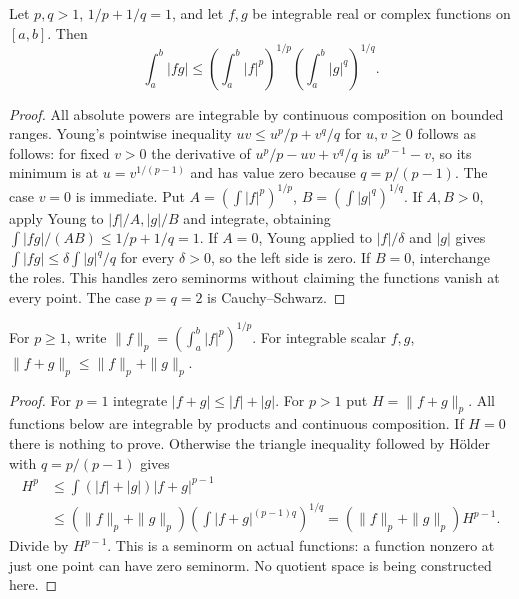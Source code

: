 \begin{theorem}
Let $p,q>1$, $1/p+1/q=1$, and let $f,g$ be integrable real or complex
functions on $[a,b]$. Then
\[\int_a^b|fg|\le
\left(\int_a^b|f|^p\right)^{1/p}
\left(\int_a^b|g|^q\right)^{1/q}.
\]
\end{theorem}
\begin{proof}
All absolute powers are integrable by continuous composition on bounded
ranges. Young's pointwise inequality $uv\le u^p/p+v^q/q$ for $u,v\ge0$
follows as follows: for fixed $v>0$ the derivative of
$u^p/p-uv+v^q/q$ is $u^{p-1}-v$, so its minimum is at
$u=v^{1/(p-1)}$ and has value zero because $q=p/(p-1)$.
The case $v=0$ is immediate.
Put $A=(\int|f|^p)^{1/p}$, $B=(\int|g|^q)^{1/q}$.
If $A,B>0$, apply Young to $|f|/A,|g|/B$ and integrate, obtaining
$\int|fg|/(AB)\le1/p+1/q=1$.
If $A=0$, Young applied to $|f|/\delta$ and $|g|$ gives
$\int|fg|\le\delta\int|g|^q/q$ for every $\delta>0$, so the left
side is zero. If $B=0$, interchange the roles. This handles zero
seminorms without claiming the functions vanish at every point.
The case $p=q=2$ is Cauchy--Schwarz.
\end{proof}

\begin{theorem}
For $p\ge1$, write $\|f\|_p=(\int_a^b|f|^p)^{1/p}$.
For integrable scalar $f,g$, $\|f+g\|_p\le\|f\|_p+\|g\|_p$.
\end{theorem}
\begin{proof}
For $p=1$ integrate $|f+g|\le|f|+|g|$.
For $p>1$ put $H=\|f+g\|_p$. All functions below are integrable
by products and continuous composition. If $H=0$ there is nothing to
prove. Otherwise the triangle inequality followed by H\"older with
$q=p/(p-1)$ gives
\begin{align*}
H^p&\le\int(|f|+|g|)|f+g|^{p-1}\\
&\le(\|f\|_p+\|g\|_p)
\left(\int|f+g|^{(p-1)q}\right)^{1/q}
=(\|f\|_p+\|g\|_p)H^{p-1}.
\end{align*}
Divide by $H^{p-1}$. This is a seminorm on actual functions: a function
nonzero at just one point can have zero seminorm. No quotient space is
being constructed here.
\end{proof}

